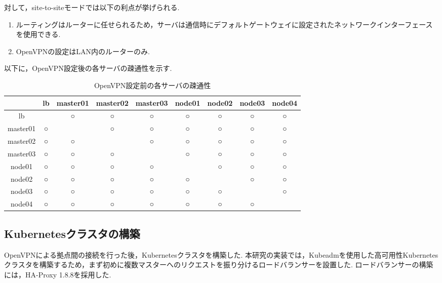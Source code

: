 対して，site-to-siteモードでは以下の利点が挙げられる.

\begin{enumerate}
  \item ルーティングはルーターに任せられるため，サーバは通信時にデフォルトゲートウェイに設定されたネットワークインターフェースを使用できる.
  \item OpenVPNの設定はLAN内のルーターのみ.
\end{enumerate}

以下に，OpenVPN設定後の各サーバの疎通性を示す.

\begin{table}[htb]
  \begin{center}
    \caption{OpenVPN設定前の各サーバの疎通性}
    \begin{tabular}{|c|c|c|c|c|c|c|c|c|} \hline
      & lb & master01 & master02 & master03 & node01 & node02 & node03 & node04 \\ \hline
      lb & \ & ○ & ○ & ○ & ○ & ○ & ○ & ○ \\ \hline
      master01 & ○ & \ & ○ & ○ & ○ & ○ & ○ & ○ \\ \hline
      master02 & ○ & ○ & \ & ○ & ○ & ○ & ○ & ○ \\ \hline
      master03 & ○ & ○ & ○ & \ & ○ & ○ & ○ & ○ \\ \hline
      node01 & ○ & ○ & ○ & ○ & \ & ○ & ○ & ○ \\ \hline
      node02 & ○ & ○ & ○ & ○ & ○ & \ & ○ & ○ \\ \hline
      node03 & ○ & ○ & ○ & ○ & ○ & ○ & \ & ○ \\ \hline
      node04 & ○ & ○ & ○ & ○ & ○ & ○ & ○ & \ \\ \hline
    \end{tabular}
  \end{center}
\end{table}

\subsection{Kubernetesクラスタの構築}

OpenVPNによる拠点間の接続を行った後，Kubernetesクラスタを構築した.
本研究の実装では，Kubeadmを使用した高可用性Kubernetesクラスタを構築するため，まず初めに複数マスターへのリクエストを振り分けるロードバランサーを設置した.
ロードバランサーの構築には，HA-Proxy 1.8.8を採用した.\\

